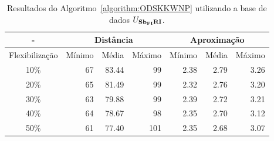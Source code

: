 \begin{table}[!htb]
  \caption{Resultados do Algoritmo~\ref{algorithm:ODSKKWNP} utilizando a base de dados $U_{\textbf{Sb\textsubscript{FI}RI}}{}$.}
  \label{table:EZSBDOGH}
  \centering
  \begin{tabular}{|c|r|r|r|r|r|r|}
    \hline
      -            & \multicolumn{3}{c|}{Distância}             & \multicolumn{3}{c|}{Aproximação}           \\ \hline
    Flexibilização & Mínimo       & Média        & Máximo       & Mínimo       & Média        & Máximo       \\ \hline  
    10\%           & 67           & 83.44        & 99           & 2.38         & 2.79         & 3.26         \\ \hline
    20\%           & 65           & 81.49        & 99           & 2.32         & 2.76         & 3.20         \\ \hline
    30\%           & 63           & 79.88        & 99           & 2.39         & 2.72         & 3.21         \\ \hline
    40\%           & 64           & 78.67        & 98           & 2.35         & 2.70         & 3.12         \\ \hline
    50\%           & 61           & 77.40        & 101          & 2.35         & 2.68         & 3.07         \\ \hline    
  \end{tabular}
\end{table}